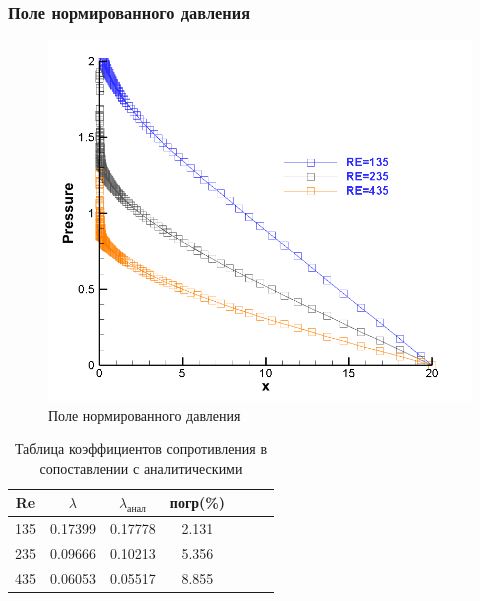 \documentclass[12pt, a4paper]{article}
\begin{document}
\subsubsection{Поле нормированного давления}
\begin{figure}[H]
    \centering
    \includegraphics[scale = 0.6]{figure/pressure_RE=all.png}
    \caption{Поле нормированного давления }
    \label{pic9}
\end{figure}

\begin{table}[H]
    \centering
    \begin{tabular}{|c|c|c|c|c|c|c|}
    \hline
        Re  &  $\lambda$  &  $\lambda_{\text{анал}}$  &  погр(\%) \\
    \hline
        135  &  0.17399 &  0.17778  &  2.131\\
    \hline
        235	 &  0.09666  &  0.10213	 &  5.356\\
    \hline
        435  &  0.06053  &  0.05517  &  8.855\\
    \hline
    \end{tabular}
    \caption{Таблица коэффициентов сопротивления в сопоставлении с аналитическими}
    \label{tab2}
\end{table}
\end{document}
